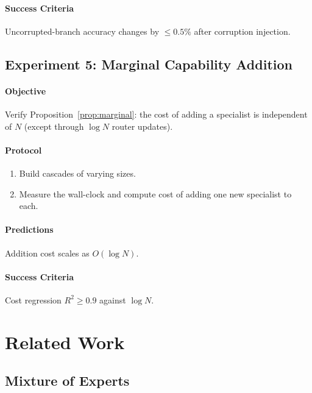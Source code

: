 \documentclass[11pt,twocolumn,a4paper]{article}
\theoremstyle{definition}
\theoremstyle{remark}
\begin{document}
\paragraph{Success Criteria}
Uncorrupted-branch accuracy changes by $\leq 0.5\%$ after corruption injection.

\subsection{Experiment 5: Marginal Capability Addition}

\paragraph{Objective} Verify Proposition~\ref{prop:marginal}: the cost of adding a specialist is independent of $N$ (except through $\log N$ router updates).

\paragraph{Protocol}
\begin{enumerate}
    \item Build cascades of varying sizes.
    \item Measure the wall-clock and compute cost of adding one new specialist to each.
\end{enumerate}

\paragraph{Predictions}
Addition cost scales as $O(\log N)$.

\paragraph{Success Criteria}
Cost regression $R^2 \geq 0.9$ against $\log N$.

\section{Related Work}
\label{sec:related}

\subsection{Mixture of Experts}
\end{document}
